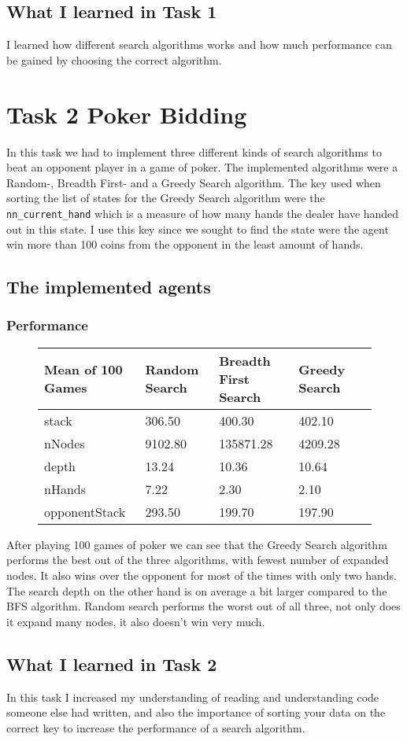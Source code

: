 \documentclass{article}
\begin{document}
\subsection{What I learned in Task 1}
I learned how different search algorithms works and how much performance can be gained by choosing the
correct algorithm.

\newpage
\section{Task 2 Poker Bidding}
In this task we had to implement three different kinds of search algorithms to beat
an opponent player in a game of poker. The implemented algorithms were a Random-, Breadth First-
and a Greedy Search algorithm. The key used when sorting the list of states for the Greedy Search algorithm
were the \texttt{nn\_current\_hand} which is a measure of how many hands the dealer have handed out in this state.
I use this key since we sought to find the state were the agent win more than 100 coins from the opponent in the least
amount of hands.
\subsection{The implemented agents}
\subsubsection{Performance}
\begin{figure}[H]
    \center
    \begin{tabular}{llllr}
        \toprule
        {Mean of 100 Games} & {Random Search} & {Breadth First Search} & {Greedy Search}  \\
        \midrule
        stack         &   306.50 &     400.30 &   402.10 \\ 
        nNodes        &  9102.80 &  135871.28 &  4209.28 \\
        depth         &    13.24 &      10.36 &    10.64 \\
        nHands        &     7.22 &       2.30 &     2.10 \\
        opponentStack &   293.50 &     199.70 &   197.90 \\
        \bottomrule
    \end{tabular}
       
\end{figure}
After playing 100 games of poker we can see that the Greedy Search algorithm performs the best
out of the three algorithms, with fewest number of expanded nodes. It also wins over the opponent
for most of the times with only two hands. The search depth on the other hand is on average a bit
larger compared to the BFS algorithm. Random search performs the worst out of all three, not only
does it expand many nodes, it also doesn't win very much.

\subsection{What I learned in Task 2}
In this task I increased my understanding of reading and understanding code someone else had written,
and also the importance of sorting your data on the correct key to increase the performance of a search algorithm.
\end{document}

